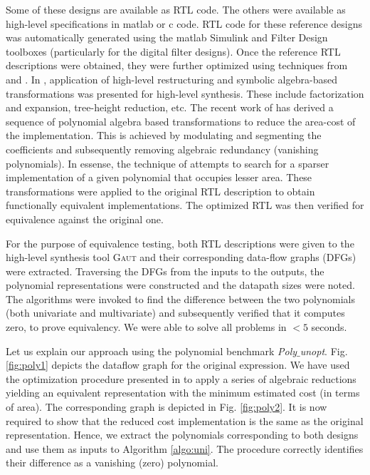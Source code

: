 Some of these designs are available as RTL code. The others were
available as high-level specifications in {\sc matlab} or {\sc c}
code. RTL code for these reference designs was automatically generated
using the {\sc matlab} Simulink and Filter Design toolboxes
(particularly for the digital filter designs). 
%
%
Once the reference RTL descriptions were obtained, they were further
optimized using techniques from \cite{demicheli:tcad_03} and
\cite{sivaram:iwls06}. In \cite{demicheli:tcad_03}, application of
high-level restructuring and symbolic algebra-based
transformations was presented for high-level synthesis. These include
factorization and expansion, tree-height reduction, etc. The recent
work of \cite{sivaram:iwls06} has derived a sequence of polynomial
algebra based transformations to reduce the area-cost of the
implementation. This is achieved by modulating and segmenting the
coefficients and subsequently removing algebraic redundancy (vanishing
polynomials). In essense, the technique of \cite{sivaram:iwls06}
attempts to search for a sparser implementation of a given polynomial
that occupies lesser area. These transformations were applied to
the original RTL description to obtain functionally equivalent
implementations. The optimized RTL was then verified for equivalence 
against the original one. 

For the purpose of equivalence testing, both RTL descriptions were
given to the high-level synthesis tool \textsc{Gaut} \cite{gaut} and
their corresponding data-flow graphs (DFGs) were extracted. Traversing
the DFGs from the inputs to the outputs, the polynomial
representations were constructed and the datapath sizes were
noted. The algorithms were invoked to find the difference between the
two polynomials (both univariate and multivariate) and subsequently
verified that it computes zero, to prove equivalency. We were able to
solve all problems in $<5$ seconds. 

Let us explain our approach using the polynomial benchmark {\it
Poly$\_$unopt}. Fig. \ref{fig:poly1} depicts the dataflow graph for
the original expression. We have used the optimization procedure
presented in \cite{sivaram:iwls06} to apply a series of algebraic
reductions yielding an equivalent representation with the minimum
estimated cost (in terms of area). The corresponding graph is depicted
in Fig. \ref{fig:poly2}. It is now required to show that the reduced
cost implementation is the same as the original representation. Hence,
we extract the polynomials corresponding to both designs and use them
as inputs to Algorithm \ref{algo:uni}. The procedure correctly
identifies their difference as a vanishing (zero) polynomial. 

